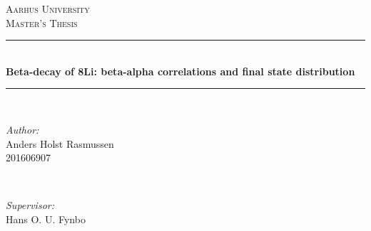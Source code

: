 \documentclass[12pt]{article}
\begin{document}
\begin{titlepage}

\newcommand{\HRule}{\rule{\linewidth}{0.5mm}} %

\center %
 

\textsc{\LARGE Aarhus University}\\[1.5cm] %
\textsc{\Large Master's Thesis}\\[0.5cm] %



\HRule \\[0.4cm]
{ \Large \bfseries Beta-decay of 8Li: beta-alpha correlations and final state distribution}\\[0.4cm] %
\HRule \\[1.5cm]
 

\begin{minipage}{0.4\textwidth}
\begin{flushleft} \large
\emph{Author:}\\
Anders Holst Rasmussen\\
201606907 %
\end{flushleft}
\end{minipage}
~
\begin{minipage}{0.4\textwidth}
\begin{flushright} \large
\emph{Supervisor:} \\
Hans O. U. Fynbo %
\end{flushright}
\end{minipage}\\[2cm]



\end{titlepage}
\end{document}
